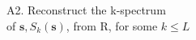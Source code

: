 \documentclass[preview]{standalone}
\begin{document}
\begin{center}
A2. Reconstruct the k-spectrum\\ of $\textbf{s}, {S}_k(\textbf{s})$, from R, for some $k \le L$
\end{center}
\end{document}
